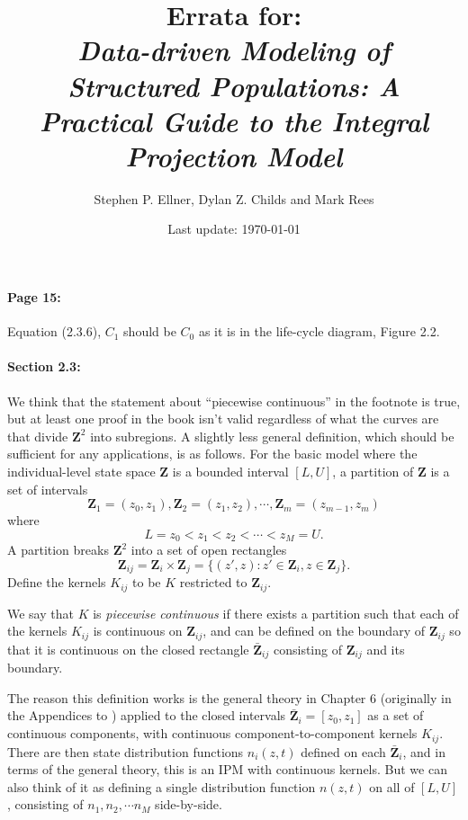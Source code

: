 \documentclass[12pt]{article}
\numberwithin{Box}{section}
\def\Z{\mathbf{Z}}
\newcommand{\be}{\begin{equation}}
\newcommand{\ee}{\end{equation}}
\begin{document}
\author{Stephen P. Ellner, Dylan Z. Childs and Mark Rees}
\title{Errata for: \\ \emph{Data-driven Modeling of Structured Populations: 
A Practical Guide to the Integral Projection Model}} 

\date{Last update: \today} 

\maketitle

\paragraph{Page 15:} Equation (2.3.6), $C_1$ should be $C_0$ as it is in the life-cycle diagram, Figure 2.2. 

\paragraph{Section 2.3:} We think that the statement about ``piecewise continuous'' in the footnote is true, but at least one proof in the book isn't valid regardless of what the curves are that divide $\Z^2$ into subregions. A slightly less general definition, which should be sufficient for any applications, is as follows. For the basic
model where the individual-level state space $\Z$ is a 
bounded interval $[L,U]$, a partition of $\Z$ is a set of 
intervals 
\begin{equation}
\Z_1 = (z_0,z_1), \Z_2 = (z_1,z_2), \cdots, \Z_m = (z_{m-1},z_m) 
\end{equation}
where 
\be
L=z_0 < z_1 < z_2 < \cdots < z_M=U. 
\ee
A partition breaks $\Z^2$ into a set of open rectangles 
$$\Z_{ij} = \Z_i \times \Z_j = \{(z',z): z' \in \Z_i, z \in \Z_j\}.$$
Define the kernels $K_{ij}$ to be $K$ restricted to $\Z_{ij}$. 

We say that $K$ is \emph{piecewise continuous} if there exists a 
partition such that each of the kernels $K_{ij}$ is continuous on $\Z_{ij}$, 
and can be defined on the boundary of $\Z_{ij}$ so that it is continuous
on the closed rectangle $\bar{\Z}_{ij}$ consisting of $\Z_{ij}$ and its boundary.  

The reason this definition works is the general theory in Chapter 6
(originally in the Appendices to \citet{ellner-rees-2006}) applied to the  
closed intervals $\bar{\Z}_{i} =  [z_0,z_1]$ as a set of continuous components, 
with continuous component-to-component kernels $K_{ij}$. There are then state distribution 
functions $n_i(z,t)$ defined on each $\bar{\Z}_i$, and in terms of the general     
theory, this is an IPM with continuous kernels. But we can also think of it as defining a 
single distribution function $n(z,t)$ on all of $[L,U]$, consisting of $n_1,n_2, \cdots n_M$ 
side-by-side. 
\end{document}
